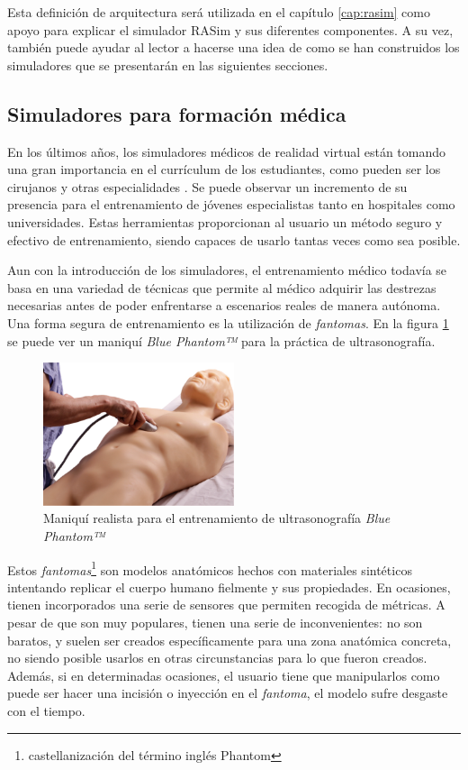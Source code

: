 Esta definición de arquitectura será utilizada en el capítulo \ref{cap:rasim} como apoyo para explicar el simulador \ac{RASim} y sus diferentes componentes. A su vez, también puede ayudar al lector a hacerse una idea de como se han construidos los simuladores que se presentarán en las siguientes secciones.

\subsection{Simuladores para formación médica}
\label{art:medicalsim}

En los últimos años, los simuladores médicos de realidad virtual están tomando una gran importancia en el currículum de los estudiantes, como pueden ser los cirujanos y otras especialidades \cite{PATEL2017266.e7}. Se puede observar un incremento de su presencia para el entrenamiento de jóvenes especialistas tanto en hospitales como universidades. Estas herramientas proporcionan al usuario un método seguro y efectivo de entrenamiento, siendo capaces de usarlo tantas veces como sea posible. 

Aun con la introducción de los simuladores, el entrenamiento médico todavía se basa en una variedad de técnicas que permite al médico adquirir las destrezas necesarias antes de poder enfrentarse a escenarios reales de manera autónoma. Una forma segura de entrenamiento es la utilización de \emph{fantomas}\cite{phantomra}. En la figura \ref{fig:phantom} se puede ver un maniquí \emph{Blue Phantom™}\cite{BluePH} para la práctica de ultrasonografía.

\begin{figure}[h]
   \centering
    \includegraphics[width=0.5\textwidth]{IMG/fast_trauma.jpg}
    \caption{Maniquí realista para el entrenamiento de ultrasonografía  \emph{Blue Phantom™}\cite{BluePH} }
   \label{fig:phantom}
\end{figure}

Estos \emph{fantomas}\footnote{castellanización del término inglés Phantom} son modelos anatómicos hechos con materiales sintéticos intentando replicar el cuerpo humano fielmente y sus propiedades. En ocasiones, tienen incorporados una serie de sensores que permiten recogida de métricas. A pesar de que son muy populares, tienen una serie de inconvenientes: no son baratos, y suelen ser creados específicamente para una zona anatómica concreta, no siendo posible usarlos en otras circunstancias para lo que fueron creados. Además, si en determinadas ocasiones, el usuario tiene que manipularlos como puede ser hacer una incisión o inyección en el \emph{fantoma}, el modelo sufre desgaste con el tiempo.

